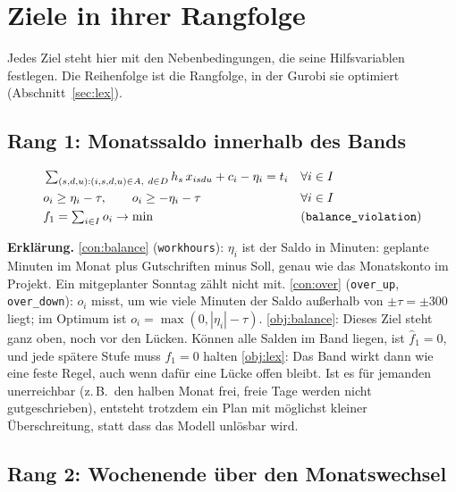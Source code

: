 \documentclass[11pt]{combiArticle}
\newcommand{\code}[1]{\texttt{#1}}
\begin{document}
\section{Ziele in ihrer Rangfolge}\label{sec:ziele}

Jedes Ziel steht hier mit den Nebenbedingungen, die seine Hilfsvariablen festlegen. Die Reihenfolge ist die
Rangfolge, in der Gurobi sie optimiert (Abschnitt~\ref{sec:lex}).

\subsection{Rang 1: Monatssaldo innerhalb des Bands}\label{sec:z:saldo}

\begin{align}
  & \textstyle\sum_{(s,d,u) : (i,s,d,u) \in A,\ d \in D} h_s\, x_{isdu} + c_i - \eta_i = t_i && \forall i \in I \label{con:balance}\\
  & o_i \ge \eta_i - \tau,\qquad o_i \ge -\eta_i - \tau && \forall i \in I \label{con:over}\\
  & f_1 = \textstyle\sum_{i \in I} o_i \to \min && \text{(\code{balance\_violation})} \label{obj:balance}
\end{align}

\textbf{Erklärung.}
\eqref{con:balance} (\code{workhours}): $\eta_i$ ist der Saldo in Minuten: geplante Minuten im Monat plus
Gutschriften minus Soll, genau wie das Monatskonto im Projekt. Ein mitgeplanter Sonntag zählt nicht mit.
\eqref{con:over} (\code{over\_up}, \code{over\_down}): $o_i$ misst, um wie viele Minuten der Saldo außerhalb von
$\pm\tau = \pm 300$ liegt; im Optimum ist $o_i = \max(0, |\eta_i| - \tau)$.
\eqref{obj:balance}: Dieses Ziel steht ganz oben, noch vor den Lücken. Können alle Salden im Band liegen, ist
$\hat f_1 = 0$, und jede spätere Stufe muss $f_1 = 0$ halten \eqref{obj:lex}: Das Band wirkt dann wie eine feste
Regel, auch wenn dafür eine Lücke offen bleibt. Ist es für jemanden unerreichbar (z.\,B.\ den halben Monat frei,
freie Tage werden nicht gutgeschrieben), entsteht trotzdem ein Plan mit möglichst kleiner Überschreitung, statt dass das Modell unlösbar wird.

\subsection{Rang 2: Wochenende über den Monatswechsel}\label{sec:z:wochenende}
\end{document}
